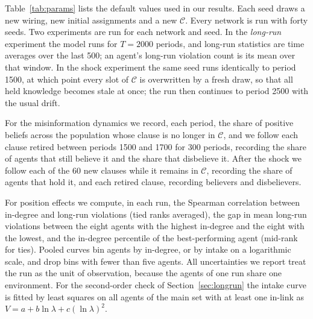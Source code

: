 \documentclass[11pt]{article}
\begin{document}
Table~\ref{tab:params} lists the default values used in our results. Each seed draws a new wiring, new initial assignments and a new $\mathcal{C}$. Every network is run with forty seeds. Two experiments are run for each network and seed. In the \emph{long-run} experiment the model runs for $T = 2000$ periods, and long-run statistics are time averages over the last 500; an agent's long-run violation count is its mean over that window. In the shock experiment the same seed runs identically to period 1500, at which point every slot of $\mathcal{C}$ is overwritten by a fresh draw, so that all held knowledge becomes stale at once; the run then continues to period 2500 with the usual drift.

For the misinformation dynamics we record, each period, the share of positive beliefs across the population whose clause is no longer in $\mathcal{C}$, and we follow each clause retired between periods 1500 and 1700 for 300 periods, recording the share of agents that still believe it and the share that disbelieve it. After the shock we follow each of the 60 new clauses while it remains in $\mathcal{C}$, recording the share of agents that hold it, and each retired clause, recording believers and disbelievers.

For position effects we compute, in each run, the Spearman correlation between in-degree and long-run violations (tied ranks averaged), the gap in mean long-run violations between the eight agents with the highest in-degree and the eight with the lowest, and the in-degree percentile of the best-performing agent (mid-rank for ties). Pooled curves bin agents by in-degree, or by intake on a logarithmic scale, and drop bins with fewer than five agents. All uncertainties we report treat the run as the unit of observation, because the agents of one run share one environment. For the second-order check of Section~\ref{sec:longrun} the intake curve is fitted by least squares on all agents of the main set with at least one in-link as $V = a + b\ln\lambda + c(\ln\lambda)^2$.
\end{document}
